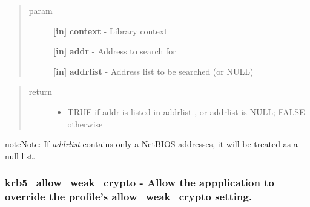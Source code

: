\documentclass[letterpaper,10pt,english]{sphinxmanual}
\begin{document}
\begin{quote}\begin{description}
\item[{param}] \leavevmode
\textbf{{[}in{]}} \textbf{context} - Library context

\textbf{{[}in{]}} \textbf{addr} - Address to search for

\textbf{{[}in{]}} \textbf{addrlist} - Address list to be searched (or NULL)

\end{description}\end{quote}
\begin{quote}\begin{description}
\item[{return}] \leavevmode\begin{itemize}
\item {} 
TRUE if addr is listed in addrlist , or addrlist is NULL; FALSE otherwise

\end{itemize}

\end{description}\end{quote}

\begin{notice}{note}{Note:}
If \emph{addrlist} contains only a NetBIOS addresses, it will be treated as a null list.
\end{notice}


\subsubsection{krb5\_allow\_weak\_crypto -  Allow the appplication to override the profile's allow\_weak\_crypto setting.}
\label{appdev/refs/api/krb5_allow_weak_crypto::doc}\label{appdev/refs/api/krb5_allow_weak_crypto:krb5-allow-weak-crypto-allow-the-appplication-to-override-the-profile-s-allow-weak-crypto-setting}

\begin{fulllineitems}
\label{appdev/refs/api/krb5_allow_weak_crypto:c.krb5_allow_weak_crypto}
\end{fulllineitems}
\end{document}
